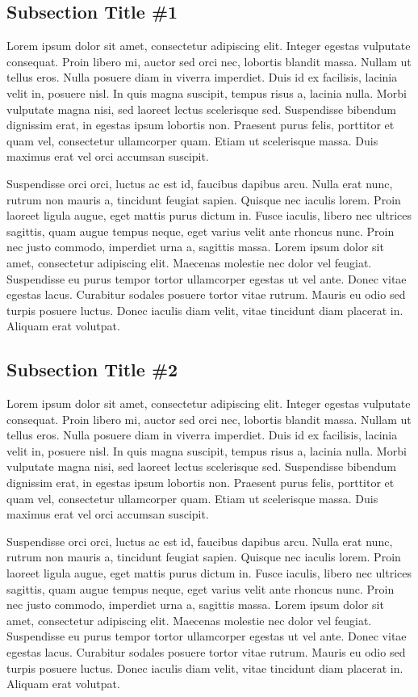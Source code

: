 \documentclass[phd]{und-thesis}
\begin{document}
\subsection{Subsection Title \#1}

Lorem ipsum dolor sit amet, consectetur adipiscing elit. Integer egestas vulputate consequat. Proin libero mi, auctor sed orci nec, lobortis blandit massa. Nullam ut tellus eros. Nulla posuere diam in viverra imperdiet. Duis id ex facilisis, lacinia velit in, posuere nisl. In quis magna suscipit, tempus risus a, lacinia nulla. Morbi vulputate magna nisi, sed laoreet lectus scelerisque sed. Suspendisse bibendum dignissim erat, in egestas ipsum lobortis non. Praesent purus felis, porttitor et quam vel, consectetur ullamcorper quam. Etiam ut scelerisque massa. Duis maximus erat vel orci accumsan suscipit.

Suspendisse orci orci, luctus ac est id, faucibus dapibus arcu. Nulla erat nunc, rutrum non mauris a, tincidunt feugiat sapien. Quisque nec iaculis lorem. Proin laoreet ligula augue, eget mattis purus dictum in. Fusce iaculis, libero nec ultrices sagittis, quam augue tempus neque, eget varius velit ante rhoncus nunc. Proin nec justo commodo, imperdiet urna a, sagittis massa. Lorem ipsum dolor sit amet, consectetur adipiscing elit. Maecenas molestie nec dolor vel feugiat. Suspendisse eu purus tempor tortor ullamcorper egestas ut vel ante. Donec vitae egestas lacus. Curabitur sodales posuere tortor vitae rutrum. Mauris eu odio sed turpis posuere luctus. Donec iaculis diam velit, vitae tincidunt diam placerat in. Aliquam erat volutpat.

\subsection{Subsection Title \#2}

Lorem ipsum dolor sit amet, consectetur adipiscing elit. Integer egestas vulputate consequat. Proin libero mi, auctor sed orci nec, lobortis blandit massa. Nullam ut tellus eros. Nulla posuere diam in viverra imperdiet. Duis id ex facilisis, lacinia velit in, posuere nisl. In quis magna suscipit, tempus risus a, lacinia nulla. Morbi vulputate magna nisi, sed laoreet lectus scelerisque sed. Suspendisse bibendum dignissim erat, in egestas ipsum lobortis non. Praesent purus felis, porttitor et quam vel, consectetur ullamcorper quam. Etiam ut scelerisque massa. Duis maximus erat vel orci accumsan suscipit.

Suspendisse orci orci, luctus ac est id, faucibus dapibus arcu. Nulla erat nunc, rutrum non mauris a, tincidunt feugiat sapien. Quisque nec iaculis lorem. Proin laoreet ligula augue, eget mattis purus dictum in. Fusce iaculis, libero nec ultrices sagittis, quam augue tempus neque, eget varius velit ante rhoncus nunc. Proin nec justo commodo, imperdiet urna a, sagittis massa. Lorem ipsum dolor sit amet, consectetur adipiscing elit. Maecenas molestie nec dolor vel feugiat. Suspendisse eu purus tempor tortor ullamcorper egestas ut vel ante. Donec vitae egestas lacus. Curabitur sodales posuere tortor vitae rutrum. Mauris eu odio sed turpis posuere luctus. Donec iaculis diam velit, vitae tincidunt diam placerat in. Aliquam erat volutpat.
\end{document}
